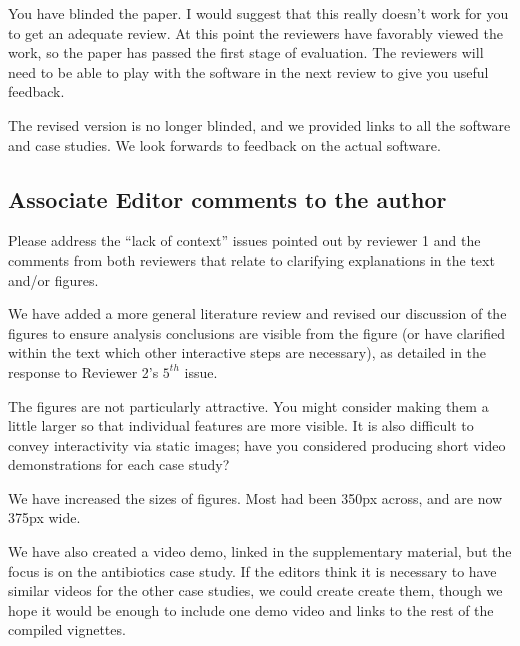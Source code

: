 \documentclass{article}
\begin{document}
\color{blue}
You have blinded the paper. I would suggest that this really doesn't work for
you to get an adequate review. At this point the reviewers have favorably viewed
the work, so the paper has passed the first stage of evaluation. The reviewers
will need to be able to play with the software in the next review to give you
useful feedback.

\color{black}
The revised version is no longer blinded, and we provided links to all the
software and case studies. We look forwards to feedback on the actual software.

\subsection{Associate Editor comments to the author}

\color{blue}

Please address the ``lack of context'' issues pointed out by reviewer 1 and the
comments from both reviewers that relate to clarifying explanations in the text
and/or figures.

\color{black}
We have added a more general literature review and revised our discussion of the
figures to ensure analysis conclusions are visible from the figure (or have
clarified within the text which other interactive steps are necessary), as
detailed in the response to Reviewer 2's $5^{th}$ issue.

\color{blue}

The figures are not particularly attractive. You might consider making them a
little larger so that individual features are more visible. It is also difficult
to convey interactivity via static images; have you considered producing short
video demonstrations for each case study?

\color{black}
We have increased the sizes of figures. Most had been 350px across, and are now
375px wide.

We have also created a video demo, linked in the supplementary material, but the
focus is on the antibiotics case study. If the editors think it is necessary to
have similar videos for the other case studies, we could create create them,
though we hope it would be enough to include one demo video and links to the
rest of the compiled vignettes.
\end{document}
